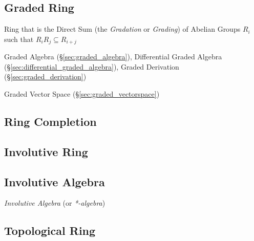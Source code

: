 \subsection{Graded Ring}\label{sec:graded_ring}

Ring that is the Direct Sum (the \emph{Gradation} or \emph{Grading}) of Abelian
Groups $R_i$ such that $R_iR_j \subseteq R_{i+j}$

Graded Algebra (\S\ref{sec:graded_algebra}),
Differential Graded Algebra (\S\ref{sec:differential_graded_algebra}),
Graded Derivation (\S\ref{sec:graded_derivation})

Graded Vector Space (\S\ref{sec:graded_vectorspace})



\subsection{Ring Completion}\label{sec:ring_completion}

\subsection{Involutive Ring}\label{sec:involutive_ring}

\subsection{Involutive Algebra}\label{sec:involutive_algebra}

\emph{Involutive Algebra} (or \emph{*-algebra})



\subsection{Topological Ring}\label{sec:topological_ring}



